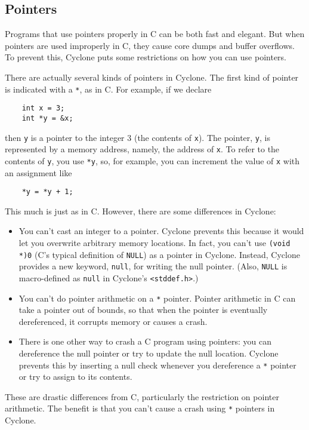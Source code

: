 \subsection{Pointers}

Programs that use pointers properly in C can be both fast and elegant.
But when pointers are used improperly in C, they cause core dumps and
buffer overflows.  To prevent this, Cyclone puts some restrictions on
how you can use pointers.

There are actually several kinds of pointers in Cyclone.  The first
kind of pointer is indicated with a \texttt{*}, as in C.  For example,
if we declare
\begin{verbatim}
    int x = 3;
    int *y = &x;
\end{verbatim}
then \texttt{y} is a pointer to the integer 3 (the contents of
\texttt{x}).  The pointer, \texttt{y}, is represented by a memory
address, namely, the address of \texttt{x}.  To refer to the contents
of \texttt{y}, you use \texttt{*y}, so, for example, you can increment
the value of \texttt{x} with an assignment like
\begin{verbatim}
    *y = *y + 1;
\end{verbatim}

This much is just as in C\@.  However, there are some differences in
Cyclone:
\begin{itemize}
\item You can't cast an integer to a pointer.  Cyclone prevents this
  because it would let you overwrite arbitrary memory locations.  In
  fact, you can't use \texttt{(void *)0} (C's typical definition of
  \texttt{NULL}) as a pointer in Cyclone.  Instead, Cyclone provides a
  new keyword, \texttt{null}, for writing the null pointer.  (Also,
  \texttt{NULL} is macro-defined as \texttt{null} in Cyclone's
  \texttt{<stddef.h>}.)
\item You can't do pointer arithmetic on a \texttt{*} pointer.
  Pointer arithmetic in C can take a pointer out of bounds, so that
  when the pointer is eventually dereferenced, it corrupts memory or
  causes a crash.
\item There is one other way to crash a C program using pointers: you
  can dereference the null pointer or try to update the null location.
  Cyclone prevents this by inserting a null check whenever you
  dereference a \texttt{*} pointer or try to assign to its contents.
\end{itemize}

These are drastic differences from C, particularly the restriction on
pointer arithmetic.  The benefit is that you can't cause a crash using
\texttt{*} pointers in Cyclone.

